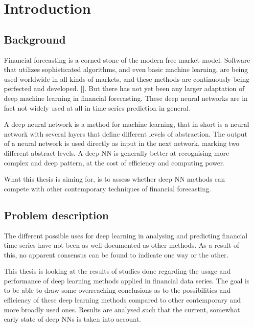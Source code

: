 \section{Introduction}

\subsection{Background}



Financial forecasting is a corned stone of the modern free market model. Software that utilizes sophisticated algorithms, and even basic machine learning, are being used worldwide in all kinds of markets, and these methods are continuously being perfected and developed. []. But there has not yet been any larger adaptation of deep machine learning in financial forecasting. These deep neural networks are in fact not widely used at all in time series prediction in general.

A deep neural network is a method for machine learning, that in short is a neural network with several layers that define different levels of abstraction. The output of a neural network is used directly as input in the next network, marking two different abstract levels. A deep NN is generally better at recognising more complex and deep pattern, at the cost of efficiency and computing power.

What this thesis is aiming for, is to assess whether deep NN methods can compete with other contemporary techniques of financial forecasting.


\subsection{Problem description}


The different possible uses for deep learning in analysing and predicting financial time series have not been as well documented as other methods. As a result of this, no apparent consensus can be found to indicate one way or the other.

This thesis is looking at the results of studies done regarding the usage and performance of deep learning methods applied in financial data series. The goal is to be able to draw some overreaching conclusions as to the possibilities and efficiency of these deep learning methods compared to other contemporary and more broadly used ones. Results are analysed such that the current, somewhat early state of deep NNs is taken into account.


